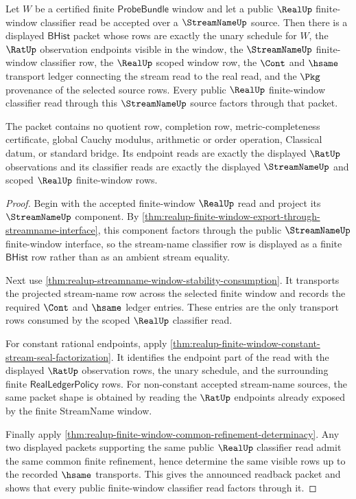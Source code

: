 \begin{theorem}
\label{thm:realup-finite-window-streamname-readback-package}
Let $W$ be a certified finite $\mathsf{ProbeBundle}$ window and let a public
$\RealUp$ finite-window classifier read be accepted over a $\StreamNameUp$
source. Then there is a displayed $\mathsf{BHist}$ packet whose rows are exactly
the unary schedule for $W$, the $\RatUp$ observation endpoints visible in the
window, the $\StreamNameUp$ finite-window classifier row, the $\RealUp$ scoped
window row, the $\Cont$ and $\hsame$ transport ledger connecting the stream
read to the real read, and the $\Pkg$ provenance of the selected source rows.
Every public $\RealUp$ finite-window classifier read through this
$\StreamNameUp$ source factors through that packet.

The packet contains no quotient row, completion row, metric-completeness
certificate, global Cauchy modulus, arithmetic or order operation, Classical
datum, or standard bridge. Its endpoint reads are exactly the displayed
$\RatUp$ observations and its classifier reads are exactly the displayed
$\StreamNameUp$ and scoped $\RealUp$ finite-window rows.
\end{theorem}
\begin{proof}
Begin with the accepted finite-window $\RealUp$ read and project its
$\StreamNameUp$ component. By
\autoref{thm:realup-finite-window-export-through-streamname-interface}, this
component factors through the public $\StreamNameUp$ finite-window interface,
so the stream-name classifier row is displayed as a finite $\mathsf{BHist}$
row rather than as an ambient stream equality.

Next use
\autoref{thm:realup-streamname-window-stability-consumption}. It transports
the projected stream-name row across the selected finite window and records
the required $\Cont$ and $\hsame$ ledger entries. These entries are the only
transport rows consumed by the scoped $\RealUp$ classifier read.

For constant rational endpoints, apply
\autoref{thm:realup-finite-window-constant-stream-seal-factorization}. It
identifies the endpoint part of the read with the displayed $\RatUp$
observation rows, the unary schedule, and the surrounding finite
$\mathsf{RealLedgerPolicy}$ rows. For non-constant accepted stream-name
sources, the same packet shape is obtained by reading the $\RatUp$ endpoints
already exposed by the finite StreamName window.

Finally apply
\autoref{thm:realup-finite-window-common-refinement-determinacy}. Any two
displayed packets supporting the same public $\RealUp$ classifier read admit
the same common finite refinement, hence determine the same visible rows up
to the recorded $\hsame$ transports. This gives the announced readback packet
and shows that every public finite-window classifier read factors through it.
\end{proof}

